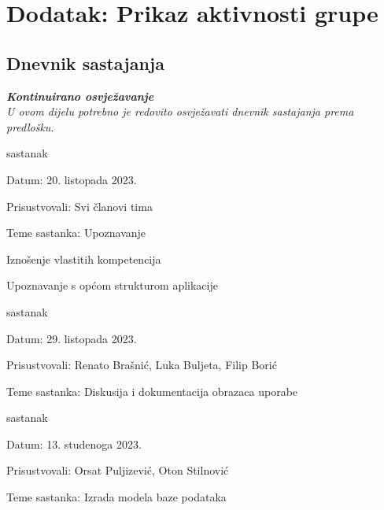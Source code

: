\chapter*{Dodatak: Prikaz aktivnosti grupe}
		
		\section*{Dnevnik sastajanja}
		
		\textbf{\textit{Kontinuirano osvježavanje}}\\
		
		 \textit{U ovom dijelu potrebno je redovito osvježavati dnevnik sastajanja prema predlošku.}
		
		\begin{packed_enum}
			\item  sastanak
			
			\item[] \begin{packed_item}
				\item Datum: 20. listopada 2023. 
				\item Prisustvovali: Svi članovi tima
				\item Teme sastanka: Upoznavanje
				\begin{packed_item}
					\item  Iznošenje vlastitih kompetencija
					\item  Upoznavanje s općom strukturom aplikacije
				\end{packed_item}
			\end{packed_item}

			\item  sastanak
			\item[] \begin{packed_item}
				\item Datum: 29. listopada 2023.
				\item Prisustvovali: Renato Brašnić, Luka Buljeta, Filip Borić
				\item Teme sastanka: Diskusija i dokumentacija obrazaca uporabe
			\end{packed_item}


			\item  sastanak
			\item[] \begin{packed_item}
				\item Datum: 13. studenoga 2023.
				\item Prisustvovali: Orsat Puljizević, Oton Stilnović
				\item Teme sastanka: Izrada modela baze podataka
			\end{packed_item}


\end{packed_enum}
